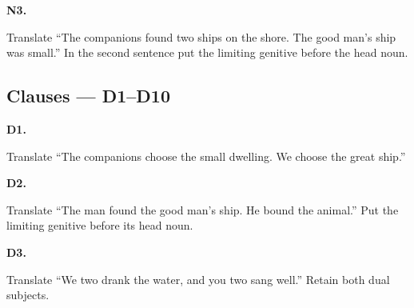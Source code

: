 \par\begin{minipage}{\linewidth}\raggedright
\textbf{N3.}

Translate “The companions found two ships on the shore. The good man’s ship was small.” In the second sentence put the limiting genitive before the head noun.

\end{minipage}\par\addvspace{4pt}

\subsection*{Clauses — D1–D10}

\par\begin{minipage}{\linewidth}\raggedright
\textbf{D1.}

Translate “The companions choose the small dwelling. We choose the great ship.”

\end{minipage}\par\addvspace{4pt}

\par\begin{minipage}{\linewidth}\raggedright
\textbf{D2.}

Translate “The man found the good man’s ship. He bound the animal.” Put the limiting genitive before its head noun.

\end{minipage}\par\addvspace{4pt}

\par\begin{minipage}{\linewidth}\raggedright
\textbf{D3.}

Translate “We two drank the water, and you two sang well.” Retain both dual subjects.

\end{minipage}\par\addvspace{4pt}

